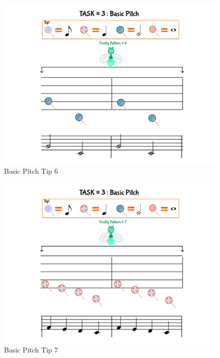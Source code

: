 \begin{figure}[H]
    \centering
    \includegraphics[width=12cm]{figures/NewFigures/BasicPitchTip6.png}
    \caption{Basic Pitch Tip 6}
    \label{fig:BasicPitchTip6}
\end{figure}

\begin{figure}[H]
    \centering
    \includegraphics[width=12cm]{figures/NewFigures/BasicPitchTip7.png}
    \caption{Basic Pitch Tip 7}
    \label{fig:BasicPitchTip7}
\end{figure}

